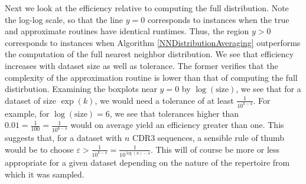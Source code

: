 \documentclass{article}
\begin{document}
Next we look at the efficiency relative to computing the full distribution.
Note the log-log scale, so that the line $y=0$ corresponds to instances when the true and approximate routines have identical runtimes.
Thus, the region $y > 0$ corresponds to instances when Algorithm \ref{NNDistributionAveraging} outperforms the computation of the full nearest neighbor distribution.
We see that efficiency increases with dataset size as well as tolerance.
The former verifies that the complexity of the approximation routine is lower than that of computing the full distirbution.
Examining the boxplots near $y = 0$ by $\log(\text{size})$, we see that for a dataset of size $\exp(k)$, we would need a tolerance of at least $\frac{1}{10^{k - 4}}$.
For example, for $\log(\text{size}) = 6$, we see that tolerances higher than $0.01 = \frac{1}{100} = \frac{1}{10^{6 - 4}}$ would on average yield an efficiency greater than one.
This suggests that, for a dataset with $n$ CDR3 sequences, a sensible rule of thumb would be to choose $\varepsilon > \frac{1}{10^{k - 4}} = \frac{1}{10^{\log(n) - 4}}$.
This will of course be more or less appropriate for a given dataset depending on the nature of the repertoire from which it was sampled.


%
\end{document}
